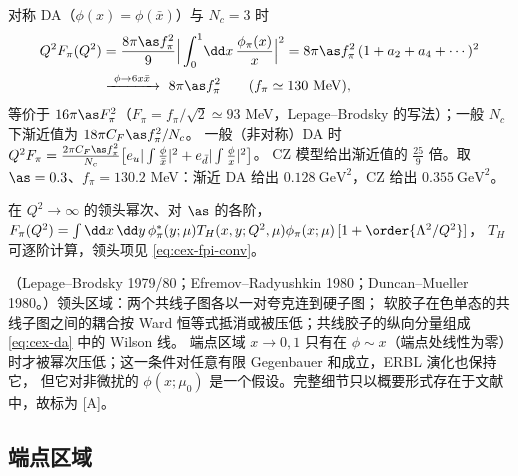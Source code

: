 \begin{corollary}[渐近行为]\label{cor:cex-fpi-asym}
对称 DA（$\phi(x)=\phi(\bar x)$）与 $N_c=3$ 时
\begin{equation}\label{eq:cex-fpi-asym}
\begin{split}
Q^2F_\pi(Q^2)&=\frac{8\pi\as f_\pi^2}{9}\Big|\int_0^1\!\dd x\,\frac{\phi_\pi(x)}{x}\Big|^2=8\pi\as f_\pi^2\,(1+a_2+a_4+\cdots)^2\\
&\xrightarrow{\ \phi\to6x\bar x\ }\ 8\pi\as f_\pi^2\qquad(f_\pi\simeq130\ \mathrm{MeV}),
\end{split}
\end{equation}
等价于 $16\pi\as F_\pi^2$（$F_\pi=f_\pi/\sqrt2\simeq93$ MeV，Lepage--Brodsky 的写法）；一般 $N_c$ 下渐近值为 $18\pi C_F\as f_\pi^2/N_c$。
一般（非对称）DA 时 $Q^2F_\pi=\frac{2\pi C_F\as f_\pi^2}{N_c}\big[e_u|\int\frac{\phi}{\bar x}|^2+e_{\bar d}|\int\frac\phi x|^2\big]$。
CZ 模型给出渐近值的 $\frac{25}{9}$ 倍。取 $\as=0.3$、$f_\pi=130.2$ MeV：渐近 DA 给出 $0.128\ \mathrm{GeV}^2$，CZ 给出 $0.355\ \mathrm{GeV}^2$。
\end{corollary}

\begin{theorem}[$\pi$ 介子形状因子的因子化]\tagA\label{thm:cex-fpi}
在 $Q^2\to\infty$ 的领头幂次、对 $\as$ 的各阶，$F_\pi(Q^2)=\int\dd x\,\dd y\,\phi^*_\pi(y;\mu)T_H(x,y;Q^2,\mu)\phi_\pi(x;\mu)\,[1+\order{\Lambda^2/Q^2}]$，
$T_H$ 可逐阶计算，领头项见 \cref{eq:cex-fpi-conv}。
\end{theorem}

\begin{proofsketch}
（Lepage--Brodsky 1979/80；Efremov--Radyushkin 1980；Duncan--Mueller 1980。）领头区域：两个共线子图各以一对夸克连到硬子图；
软胶子在色单态的共线子图之间的耦合按 Ward 恒等式抵消或被压低；共线胶子的纵向分量组成 \cref{eq:cex-da} 中的 Wilson 线。
端点区域 $x\to0,1$ 只有在 $\phi\sim x$（端点处线性为零）时才被幂次压低；这一条件对任意有限 Gegenbauer 和成立，ERBL 演化也保持它，
但它对非微扰的 $\phi(x;\mu_0)$ 是一个假设。完整细节只以概要形式存在于文献中，故标为 [A]。
\end{proofsketch}

\subsection{端点区域}\label{sec:cex-endpoint}

